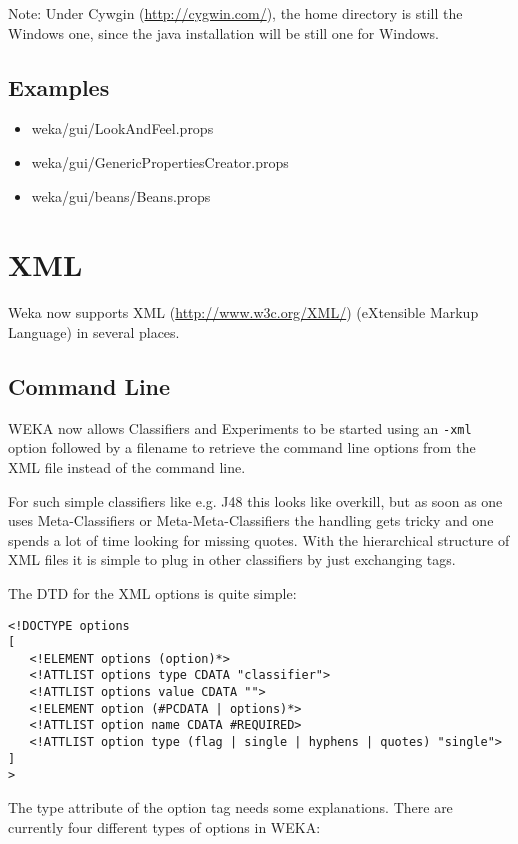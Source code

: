\noindent Note: Under Cywgin (\url{http://cygwin.com/}{}), the home directory
is still the Windows one, since the java installation will be still
one for Windows.

\subsection{Examples}

\begin{itemize}
\item weka/gui/LookAndFeel.props
\item weka/gui/GenericPropertiesCreator.props
\item weka/gui/beans/Beans.props
\end{itemize}


\section{XML}
Weka now supports XML (\url{http://www.w3c.org/XML/}{}) (eXtensible
Markup Language) in several places.

\subsection{Command Line}
\label{xml_command_line}
WEKA now allows Classifiers and Experiments to be started using an
\verb=-xml= option followed by a filename to retrieve the command line
options from the XML file instead of the command line.

For such simple classifiers like e.g. J48 this looks like overkill,
but as soon as one uses Meta-Classifiers or Meta-Meta-Classifiers the
handling gets tricky and one spends a lot of time looking for missing
quotes. With the hierarchical structure of XML files it is simple to
plug in other classifiers by just exchanging tags.

The DTD for the XML options is quite simple:

\begin{verbatim}
<!DOCTYPE options
[
   <!ELEMENT options (option)*>
   <!ATTLIST options type CDATA "classifier">
   <!ATTLIST options value CDATA "">
   <!ELEMENT option (#PCDATA | options)*>
   <!ATTLIST option name CDATA #REQUIRED>
   <!ATTLIST option type (flag | single | hyphens | quotes) "single">
]
>
\end{verbatim}

\noindent The type attribute of the option tag needs some
explanations. There are currently four different types of options in
WEKA:

